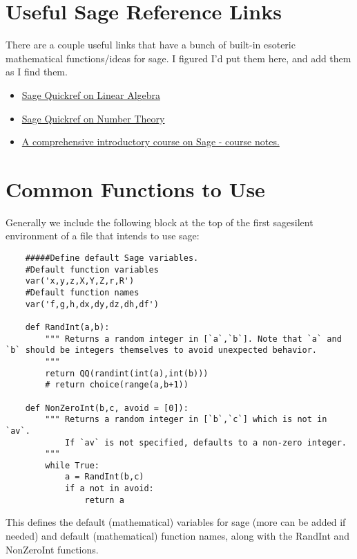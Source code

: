 \documentclass{ximera}
\begin{document}
\section{Useful Sage Reference Links}

    There are a couple useful links that have a bunch of built-in esoteric mathematical functions/ideas for sage. I figured I'd put them here, and add them as I find them.
    
    \begin{itemize}
        \item \href{https://wiki.sagemath.org/quickref?action=AttachFile&do=get&target=quickref-linalg.pdf}{Sage Quickref on Linear Algebra}
        \item \href{https://wiki.sagemath.org/quickref?action=AttachFile&do=get&target=quickref-nt.pdf}{Sage Quickref on Number Theory}
        \item \href{https://www.math.uni-potsdam.de/fileadmin/user_upload/An_Introductory_Course_on_Sage.pdf}{A comprehensive introductory course on Sage - course notes.}
    \end{itemize}

\section{Common Functions to Use}

    Generally we include the following block at the top of the first sagesilent environment of a file that intends to use sage:
    \begin{verbatim}
    #####Define default Sage variables.
    #Default function variables
    var('x,y,z,X,Y,Z,r,R')
    #Default function names
    var('f,g,h,dx,dy,dz,dh,df')
    
    def RandInt(a,b):
        """ Returns a random integer in [`a`,`b`]. Note that `a` and `b` should be integers themselves to avoid unexpected behavior.
        """
        return QQ(randint(int(a),int(b)))
        # return choice(range(a,b+1))
    
    def NonZeroInt(b,c, avoid = [0]):
        """ Returns a random integer in [`b`,`c`] which is not in `av`. 
            If `av` is not specified, defaults to a non-zero integer.
        """
        while True:
            a = RandInt(b,c)
            if a not in avoid:
                return a
    \end{verbatim}
    
    This defines the default (mathematical) variables for sage (more can be added if needed) and default (mathematical) function names, along with the RandInt and NonZeroInt functions.
    
\end{document}
